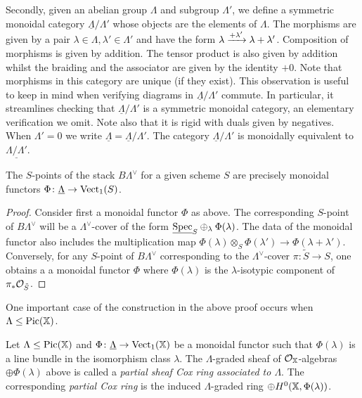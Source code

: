 \documentclass[12pt]{amsart}
\begin{document}
Secondly, given an abelian group $\Lambda$ and subgroup $\Lambda'$, we define a symmetric monoidal category $\underline{\Lambda}/\Lambda'$ whose objects are the elements of $\Lambda$.
The morphisms are given by a pair $\lambda \in \Lambda, \lambda' \in \Lambda'$ and have the form $\lambda \xrightarrow{+\lambda'} \lambda + \lambda'$. 
Composition of morphisms is given by addition. The tensor product is also given by addition whilst the braiding and the associator are given by the identity $+0$. Note that morphisms in this category are unique (if they exist). 
This observation is useful to keep in mind when verifying diagrams in $\underline{\Lambda}/\Lambda'$ commute. 
In particular, it streamlines checking that $\underline{\Lambda}/\Lambda'$ is a symmetric monoidal category, an elementary verification we omit. Note also that it is rigid with duals given by negatives.
When $\Lambda' = 0$ we write $\underline{\Lambda} = \underline{\Lambda}/\Lambda'$.
The category $\underline{\Lambda}/\Lambda'$ is monoidally equivalent to $\underline{\Lambda/\Lambda'}$.

\begin{proposition}  \label{prop:Gcovers}
The $S$-points of the stack $B\Lambda^\vee$ for a given scheme $S$ are precisely monoidal functors $\Phi \colon \underline{\Lambda} \rightarrow \operatorname{Vect}_1 (S)$.
\end{proposition}
\begin{proof}
Consider first a monoidal functor $\Phi$ as above. The corresponding $S$-point of $B\Lambda^{\vee}$ will be a $\Lambda^{\vee}$-cover of the form $\underline{\operatorname{Spec}}_{S}\oplus_{\lambda} \Phi(\lambda)$. The data of the monoidal functor also includes the multiplication map $\Phi(\lambda) \otimes_S \Phi(\lambda') \to \Phi(\lambda + \lambda')$. Conversely, for any $S$-point of $B\Lambda^{\vee}$ corresponding to the $\Lambda^{\vee}$-cover $\pi \colon \tilde{S} \to S$, one obtains a a monoidal functor $\Phi$ where $\Phi(\lambda)$ is the $\lambda$-isotypic component of $\pi_* \mathcal{O}_{\tilde{S}}$. 
\end{proof}
One important case of the construction in the above proof occurs when $\Lambda \leq \operatorname{Pic}(\mathbb{X})$.

\begin{definition}
Let $\Lambda \leq \operatorname{Pic}(\mathbb{X})$ and $\Phi \colon \underline{\Lambda} \to \operatorname{Vect}_1(\mathbb{X})$ be a monoidal functor such that $\Phi(\lambda)$ is a line bundle in the isomorphism class $\lambda$. The $\Lambda$-graded sheaf of $\mathcal{O}_{\mathbb{X}}$-algebras $\oplus \Phi(\lambda)$ above is called a {\em partial sheaf Cox ring associated to $\Lambda$}. The corresponding {\em partial Cox ring} is the induced $\Lambda$-graded ring $\oplus H^0(\mathbb{X},\Phi(\lambda))$.
\end{definition}
\end{document}
